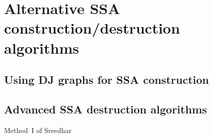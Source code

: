 \applynumberofpages\chapter{Alternative SSA construction/destruction algorithms }


\section{Using DJ graphs for SSA construction}


\section{Advanced SSA destruction algorithms}
\label{sec:advanced_destruction}

Method~I of Sreedhar

